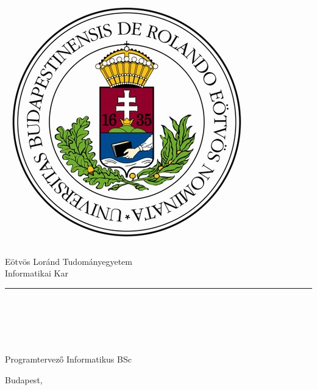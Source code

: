 \begin{titlepage}

\begin{minipage}{0.40\linewidth}
\includegraphics[scale=0.3]{img/elte-cimer}
\end{minipage}
\begin{minipage}{0.50\linewidth}
\begin{center}
Eötvös Loránd Tudományegyetem \\
Informatikai Kar \\
\TANSZEK
\end{center}
\end{minipage}

\hrule
\vfill

\begin{center}
\Huge
\textbf{\CIM}
\normalsize
\end{center}

\vfill

\begin{minipage}[t]{0.5\linewidth}
\begin{flushleft}
\textbf{\TEMAVEZETO} \\
\TEMAVEZETOBEOSZTAS \\ 
\textbf{\TEMAVEZETOKULSO} \\
\TEMAVEZETOBEOSZTASKULSO
\end{flushleft}
\end{minipage}
\begin{minipage}[t]{0.5\linewidth}
\begin{flushright}
\textbf{\SZERZO} \\
Programtervező Informatikus BSc
\end{flushright}
\end{minipage}

\vfill

\begin{center}
Budapest, \VEDESEVE
\end{center}

\end{titlepage}
